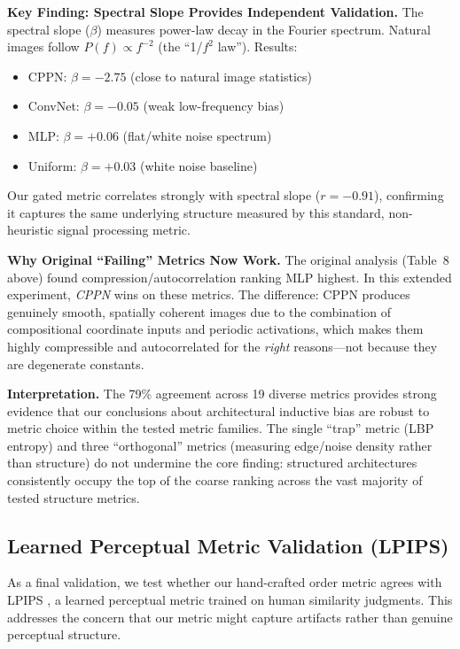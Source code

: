 \textbf{Key Finding: Spectral Slope Provides Independent Validation.}
The spectral slope ($\beta$) measures power-law decay in the Fourier spectrum. Natural images follow $P(f) \propto f^{-2}$ (the ``1/$f^2$ law''). Results:
\begin{itemize}[topsep=2pt,itemsep=2pt]
    \item CPPN: $\beta = -2.75$ (close to natural image statistics)
    \item ConvNet: $\beta = -0.05$ (weak low-frequency bias)
    \item MLP: $\beta = +0.06$ (flat/white noise spectrum)
    \item Uniform: $\beta = +0.03$ (white noise baseline)
\end{itemize}

Our gated metric correlates strongly with spectral slope ($r = -0.91$), confirming it captures the same underlying structure measured by this standard, non-heuristic signal processing metric.

\textbf{Why Original ``Failing'' Metrics Now Work.}
The original analysis (Table~8 above) found compression/autocorrelation ranking MLP highest. In this extended experiment, \emph{CPPN} wins on these metrics. The difference: CPPN produces genuinely smooth, spatially coherent images due to the combination of compositional coordinate inputs and periodic activations, which makes them highly compressible and autocorrelated for the \emph{right} reasons---not because they are degenerate constants.

\textbf{Interpretation.} The 79\% agreement across 19 diverse metrics provides strong evidence that our conclusions about architectural inductive bias are robust to metric choice within the tested metric families. The single ``trap'' metric (LBP entropy) and three ``orthogonal'' metrics (measuring edge/noise density rather than structure) do not undermine the core finding: structured architectures consistently occupy the top of the coarse ranking across the vast majority of tested structure metrics.

\subsection{Learned Perceptual Metric Validation (LPIPS)}

As a final validation, we test whether our hand-crafted order metric agrees with LPIPS \cite{zhang2018unreasonable}, a learned perceptual metric trained on human similarity judgments. This addresses the concern that our metric might capture artifacts rather than genuine perceptual structure.

